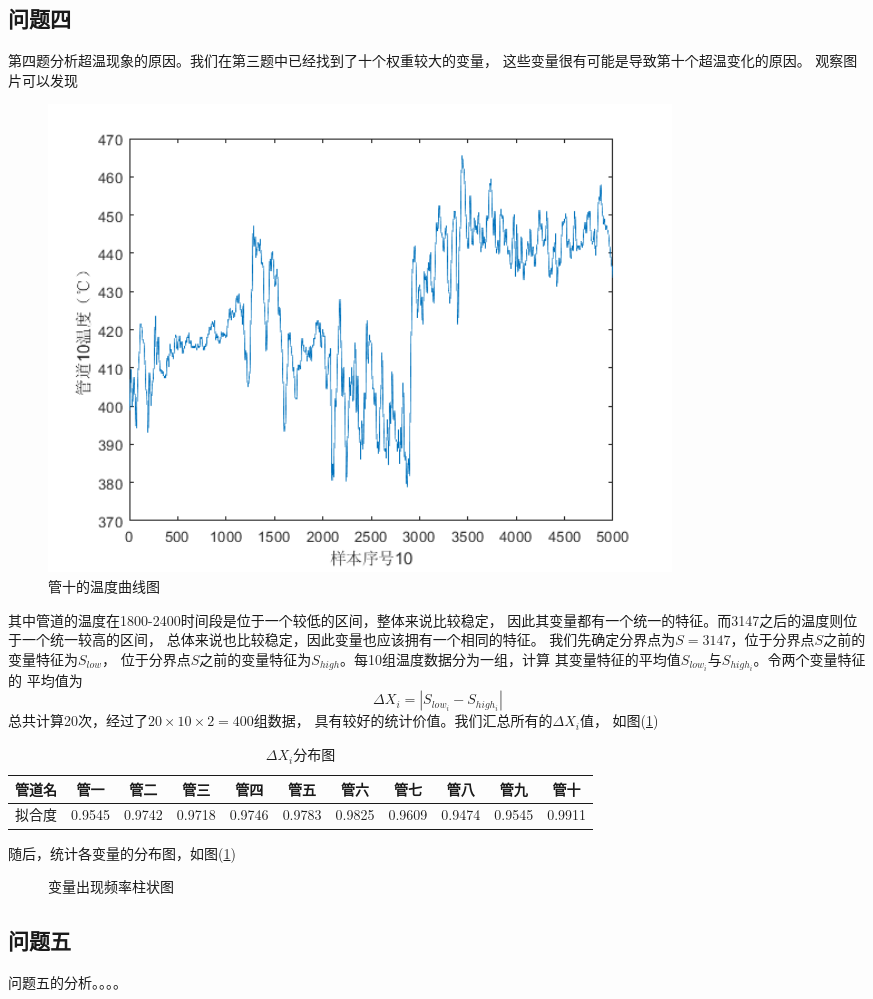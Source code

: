     \subsection{问题四}
        第四题分析超温现象的原因。我们在第三题中已经找到了十个权重较大的变量，
        这些变量很有可能是导致第十个超温变化的原因。
        观察图片可以发现
        \begin{figure}[H]
            \centering
            \includegraphics[width=0.8\textwidth]{figures/p1_10.png}
            \caption{管十的温度曲线图}
        \end{figure}
        其中管道的温度在1800-2400时间段是位于一个较低的区间，整体来说比较稳定，
        因此其变量都有一个统一的特征。而3147之后的温度则位于一个统一较高的区间，
        总体来说也比较稳定，因此变量也应该拥有一个相同的特征。
        我们先确定分界点为$S=3147$，位于分界点$S$之前的变量特征为$S_{low}$，
        位于分界点$S$之前的变量特征为$S_{high}$。每10组温度数据分为一组，计算
        其变量特征的平均值$S_{low_i}$与$S_{high_i}$。令两个变量特征的
        平均值为
        \begin{equation}
            \Delta X_i = |S_{low_i} - S_{high_i}|
        \end{equation}
        总共计算20次，经过了$20\times 10 \times 2 = 400$组数据，
        具有较好的统计价值。我们汇总所有的$\Delta X_i$值，
        如图(\ref{delta_x_distribution})
        \begin{table}
            \centering
            \begin{tabular}{|c|c|c|c|c|c|c|c|c|c|c|}
                \hline
                管道名&管一&管二&管三&管四&管五&管六&管七&管八&管九&管十\\
                \hline
                拟合度&0.9545&0.9742&0.9718&0.9746&0.9783&0.9825&0.9609&0.9474&0.9545&0.9911\\
                \hline
            \end{tabular}
            \caption{$\Delta X_i$分布图}
            \label{delta_x_distribution}
        \end{table}
        随后，统计各变量的分布图，如图(\ref{4_variable_frequency})
        \begin{figure}

            \label{4_variable_frequency}
            \caption{变量出现频率柱状图}
        \end{figure}

    \subsection{问题五}
        问题五的分析。。。。    